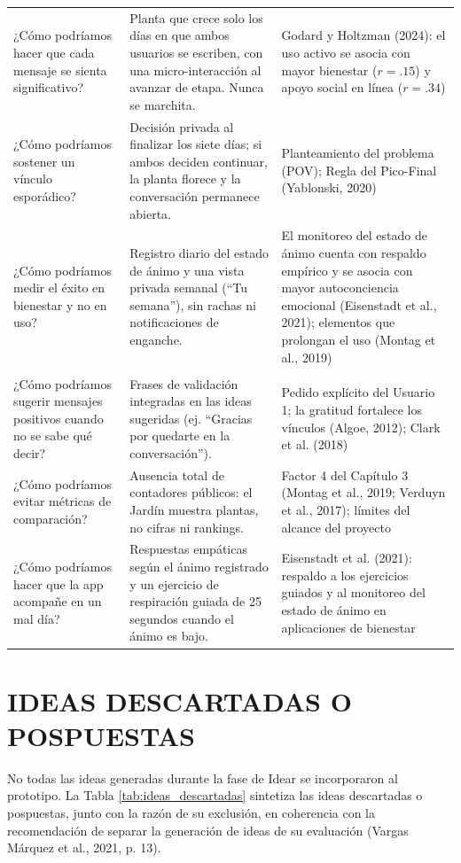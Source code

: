 \begin{longtable}{
  >{\raggedright\arraybackslash}p{}
  >{\raggedright\arraybackslash}p{}
  >{\raggedright\arraybackslash}p{}
}
¿Cómo podríamos hacer que cada mensaje se sienta significativo?
&
Planta que crece solo los días en que ambos usuarios se escriben, con una micro-interacción al avanzar de etapa. Nunca se marchita.
&
Godard y Holtzman (2024): el uso activo se asocia con mayor bienestar ($r = .15$) y apoyo social en línea ($r = .34$) \\[6pt]

¿Cómo podríamos sostener un vínculo esporádico?
&
Decisión privada al finalizar los siete días; si ambos deciden continuar, la planta florece y la conversación permanece abierta.
&
Planteamiento del problema (POV); Regla del Pico-Final (Yablonski, 2020) \\[6pt]

¿Cómo podríamos medir el éxito en bienestar y no en uso?
&
Registro diario del estado de ánimo y una vista privada semanal (``Tu semana''), sin rachas ni notificaciones de enganche.
&
El monitoreo del estado de ánimo cuenta con respaldo empírico y se asocia con mayor autoconciencia emocional (Eisenstadt et al., 2021); elementos que prolongan el uso (Montag et al., 2019) \\[6pt]

\addlinespace[4pt]
\multicolumn{3}{l}{\textbf{Conocimiento: Mensajes positivos, sin 	extit{likes} ni métricas públicas}} \\[4pt]
¿Cómo podríamos sugerir mensajes positivos cuando no se sabe qué decir?
&
Frases de validación integradas en las ideas sugeridas (ej. ``Gracias por quedarte en la conversación'').
&
Pedido explícito del Usuario 1; la gratitud fortalece los vínculos (Algoe, 2012); Clark et al. (2018) \\[6pt]

¿Cómo podríamos evitar métricas de comparación?
&
Ausencia total de contadores públicos: el Jardín muestra plantas, no cifras ni rankings.
&
Factor 4 del Capítulo 3 (Montag et al., 2019; Verduyn et al., 2017); límites del alcance del proyecto \\[6pt]

¿Cómo podríamos hacer que la app acompañe en un mal día?
&
Respuestas empáticas según el ánimo registrado y un ejercicio de respiración guiada de 25 segundos cuando el ánimo es bajo.
&
Eisenstadt et al. (2021): respaldo a los ejercicios guiados y al monitoreo del estado de ánimo en aplicaciones de bienestar \\

\end{longtable}

\section{IDEAS DESCARTADAS O POSPUESTAS}
No todas las ideas generadas durante la fase de Idear se incorporaron al prototipo. La Tabla \ref{tab:ideas_descartadas} sintetiza las ideas descartadas o pospuestas, junto con la razón de su exclusión, en coherencia con la recomendación de separar la generación de ideas de su evaluación (Vargas Márquez et al., 2021, p. 13).

